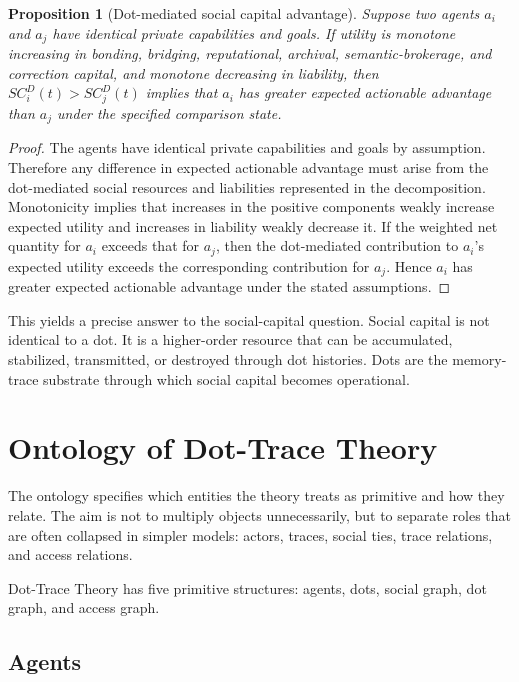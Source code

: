 \documentclass[11pt]{article}
\newtheorem{proposition}{Proposition}
\theoremstyle{remark}
\begin{document}
\begin{proposition}[Dot-mediated social capital advantage]
Suppose two agents $a_i$ and $a_j$ have identical private capabilities and goals. If utility is monotone increasing in bonding, bridging, reputational, archival, semantic-brokerage, and correction capital, and monotone decreasing in liability, then $SC_i^D(t)>SC_j^D(t)$ implies that $a_i$ has greater expected actionable advantage than $a_j$ under the specified comparison state.
\end{proposition}

\begin{proof}
The agents have identical private capabilities and goals by assumption. Therefore any difference in expected actionable advantage must arise from the dot-mediated social resources and liabilities represented in the decomposition. Monotonicity implies that increases in the positive components weakly increase expected utility and increases in liability weakly decrease it. If the weighted net quantity for $a_i$ exceeds that for $a_j$, then the dot-mediated contribution to $a_i$'s expected utility exceeds the corresponding contribution for $a_j$. Hence $a_i$ has greater expected actionable advantage under the stated assumptions.
\end{proof}

This yields a precise answer to the social-capital question. Social capital is not identical to a dot. It is a higher-order resource that can be accumulated, stabilized, transmitted, or destroyed through dot histories. Dots are the memory-trace substrate through which social capital becomes operational.
\section{Ontology of Dot-Trace Theory}\label{ontology-of-dot-trace-theory}

The ontology specifies which entities the theory treats as primitive and how they relate. The aim is not to multiply objects unnecessarily, but to separate roles that are often collapsed in simpler models: actors, traces, social ties, trace relations, and access relations.

Dot-Trace Theory has five primitive structures: agents, dots, social
graph, dot graph, and access graph.

\subsection{Agents}\label{agents}
\end{document}
